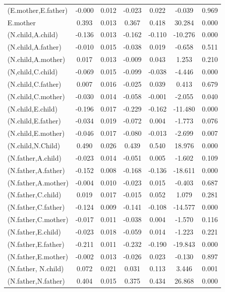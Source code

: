 \documentclass[11pt,a5paper,twoside]{book}
\begin{document}
\begin{center}
\begin{longtable}{lcccccc}
   (E.mother,E.father)  & -0.000 & 0.012 & -0.023 & 0.022 & -0.039 & 0.969 \\ 
   E.mother  & 0.393 & 0.013 & 0.367 & 0.418 & 30.284 & 0.000 \\ 
   (N.child,A.child)  & -0.136 & 0.013 & -0.162 & -0.110 & -10.276 & 0.000 \\ 
   (N.child,A.father)  & -0.010 & 0.015 & -0.038 & 0.019 & -0.658 & 0.511 \\ 
   (N.child,A.mother)  & 0.017 & 0.013 & -0.009 & 0.043 & 1.253 & 0.210 \\ 
  (N,child,C.child)  & -0.069 & 0.015 & -0.099 & -0.038 & -4.446 & 0.000 \\ 
   (N.child,C.father)  & 0.007 & 0.016 & -0.025 & 0.039 & 0.413 & 0.679 \\ 
   (N.child,C.mother)  & -0.030 & 0.014 & -0.058 & -0.001 & -2.055 & 0.040 \\ 
   (N.child,E.child)  & -0.196 & 0.017 & -0.229 & -0.162 & -11.480 & 0.000 \\ 
   (N.child,E.father)  & -0.034 & 0.019 & -0.072 & 0.004 & -1.773 & 0.076 \\ 
   (N.child,E.mother)  & -0.046 & 0.017 & -0.080 & -0.013 & -2.699 & 0.007 \\ 
   (N.child,N.Child)  & 0.490 & 0.026 & 0.439 & 0.540 & 18.976 & 0.000 \\ 
   (N.father,A.child)  & -0.023 & 0.014 & -0.051 & 0.005 & -1.602 & 0.109 \\ 
   (N.father,A.father)  & -0.152 & 0.008 & -0.168 & -0.136 & -18.611 & 0.000 \\ 
   (N.father,A.mother)  & -0.004 & 0.010 & -0.023 & 0.015 & -0.403 & 0.687 \\ 
   (N.father,C.child)  & 0.019 & 0.017 & -0.015 & 0.052 & 1.079 & 0.281 \\ 
   (N.father,C.father)  & -0.124 & 0.009 & -0.141 & -0.108 & -14.577 & 0.000 \\ 
   (N.father,C.mother)  & -0.017 & 0.011 & -0.038 & 0.004 & -1.570 & 0.116 \\ 
   (N.father,E.child)  & -0.023 & 0.018 & -0.059 & 0.014 & -1.223 & 0.221 \\ 
   (N.father,E.father)  & -0.211 & 0.011 & -0.232 & -0.190 & -19.843 & 0.000 \\ 
   (N.father,E.mother)  & -0.002 & 0.013 & -0.026 & 0.023 & -0.130 & 0.897 \\ 
   (N.father, N.child)  & 0.072 & 0.021 & 0.031 & 0.113 & 3.446 & 0.001 \\ 
   (N.father,N.father)  & 0.404 & 0.015 & 0.375 & 0.434 & 26.868 & 0.000 \\ 

\end{longtable}
\end{center}
\end{document}
